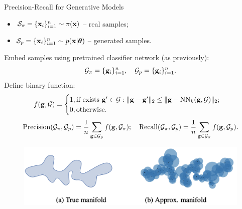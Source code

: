\begin{frame}{Precision-Recall for Generative Models}
	\begin{itemize}
		\item $\mathcal{S}_{\pi} = \{\mathbf{x}_i\}_{i=1}^{n} \sim \pi(\mathbf{x})$ -- real samples;
		\item $\mathcal{S}_{p} = \{\mathbf{x}_i\}_{i=1}^{n} \sim p(\mathbf{x} | \boldsymbol{\theta})$ -- generated samples.
	\end{itemize}
	Embed samples using pretrained classifier network (as previously):
	\[
		\mathcal{G}_{\pi} = \{\mathbf{g}_i\}_{i=1}^n, \quad \mathcal{G}_{p} = \{\mathbf{g}_i\}_{i=1}^n.
	\]
	Define binary function:
	\[
		f(\mathbf{g}, \mathcal{G}) = 
		\begin{cases}
			1, \text{if exists } \mathbf{g}' \in \mathcal{G}: \| \mathbf{g}  - \mathbf{g}'\|_2 \leq \| \mathbf{g} - \text{NN}_k(\mathbf{g}, \mathcal{G})\|_2; \\
			0, \text{otherwise.}
		\end{cases}
	\]
	\[
		\text{Precision} (\mathcal{G}_{\pi}, \mathcal{G}_{p}) = \frac{1}{n} \sum_{\mathbf{g} \in \mathcal{G}_{p}} f(\mathbf{g}, \mathcal{G}_{\pi}); \quad \text{Recall} (\mathcal{G}_{\pi}, \mathcal{G}_{p}) = \frac{1}{n} \sum_{\mathbf{g} \in \mathcal{G}_{\pi}} f(\mathbf{g}, \mathcal{G}_{p}).
	\]
	\vspace{-0.4cm}
	\begin{figure}
		\includegraphics[width=0.7\linewidth]{figs/pr_k_nearest}
	\end{figure}
\end{frame}

